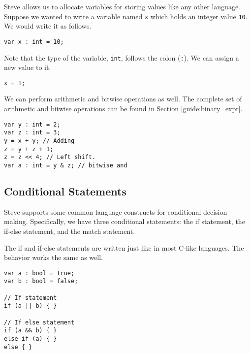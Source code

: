 Steve allows us to allocate variables for storing values like any other language. Suppose we wanted to write a variable named \texttt{x} which holds an integer value \texttt{10}. We would write it as follows.

\begin{codepage}
\begin{lstlisting}
var x : int = 10;
\end{lstlisting}
\end{codepage}

Note that the type of the variable, \texttt{int}, follows the colon (\texttt{:}). We can assign a new value to it.

\begin{codepage}
\begin{lstlisting}
x = 1;
\end{lstlisting}
\end{codepage}

We can perform arithmetic and bitwise operations as well. The complete set of arithmetic and bitwise operations can be found in Section \ref{guide:binary_expr}.

\begin{codepage}
\begin{lstlisting}
var y : int = 2;
var z : int = 3;
y = x + y; // Adding
z = y + z + 1; 
z = z << 4; // Left shift.
var a : int = y & z; // bitwise and
\end{lstlisting}
\end{codepage}


\subsection{Conditional Statements} \label{tut:condition}

Steve supports some common language constructs for conditional decision making. Specifically, we have three conditional statements: the if statement, the if-else statement, and the match statement.

The if and if-else statements are written just like in most C-like languages. The behavior works the same as well.

\begin{codepage}
\begin{lstlisting}
var a : bool = true;
var b : bool = false;

// If statement
if (a || b) { }

// If else statement
if (a && b) { }
else if (a) { }
else { }
\end{lstlisting}
\end{codepage}

